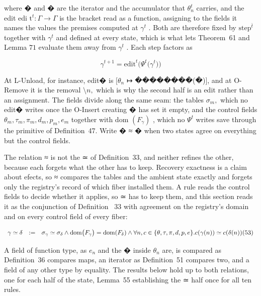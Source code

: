 \documentclass[
  10
]{article}
\begin{document}
where � and � are the iterator and the accumulator that
\(\theta _ { n } ^ { t }\) carries, and the edit edi
\(\mathrm { t } ^ { t } : \Gamma \to \Gamma\) is the bracket read as a
function, assigning to the fields it names the values the premises
computed at \(\gamma ^ { t }\) . Both are therefore fixed by
\(\mathrm { s t e p } ^ { \bar { t } }\) together with
\(\gamma ^ { t }\) and defined at every state, which is what lets
Theorem~61 and Lemma \(7 1\) evaluate them away from \(\gamma ^ { t }\)
. Each step factors as

\[
\gamma ^ { t + 1 } = \mathrm { e d i t } ^ { t } \big ( \Psi ^ { t } \big ( \gamma ^ { t } \big ) \big )\tag{52}
\]

At L-Unload, for instance, edit� is \([ \theta _ { n }\) ↦
��������(�){]}, and at O-Remove it is the removal \(\setminus n ,\)
which is why the second half is an edit rather than an assignment. The
fields divide along the same seam: the tables \(\sigma _ { m } ,\) which
no edit� writes once the O-Insert creating � has set it empty, and the
control fields
\(\theta _ { m } , \tau _ { m } , \pi _ { m } , d _ { m } , p _ { m } , e _ { m }\)
together with dom \(\left( F _ { \gamma } \right)\) , which no
\(\Psi ^ { t }\) writes save through the primitive of Definition~47.
Write � ≈ � when two states agree on everything but the control fields.

The relation ≈ is not the ≃ of Definition~33, and neither refines the
other, because each forgets what the other has to keep. Recovery
exactness is a claim about efects, so ≈ compares the tables and the
ambient state exactly and forgets only the registry's record of which
fiber installed them. A rule reads the control fields to decide whether
it applies, so ≃ has to keep them, and this section reads it as the
conjunction of Definition~ 33 with agreement on the registry's domain
and on every control field of every fiber:

\[
\begin{array} { r l r } { \gamma \simeq \delta } & { : = } & { \sigma _ { \gamma } \simeq \sigma _ { \delta } \wedge \mathrm { d o m } \big ( F _ { \gamma } \big ) = \mathrm { d o m } ( F _ { \delta } ) \wedge \forall n , c \in \{ \theta , \tau , \pi , d , p , e \} . c ( \gamma ( n ) ) \simeq c ( \delta ( n ) ) ( 5 3 ) } \end{array}
\]

A field of function type, as \(e _ { n }\) and the � inside
\(\theta _ { n }\) are, is compared as Definition~36 compares maps, an
iterator as Definition~51 compares two, and a field of any other type by
equality. The results below hold up to both relations, one for each half
of the state, Lemma~55 establishing the ≃ half once for all ten rules.
\end{document}
